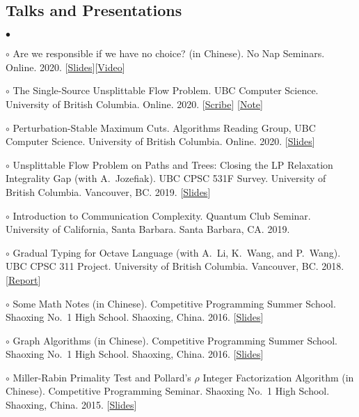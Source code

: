\documentclass[margin,line]{res}
\newenvironment{list2}{
  \begin{list}{$\bullet$}{%
      \setlength{\itemsep}{0in}
      \setlength{\parsep}{0in} \setlength{\parskip}{0in}
      \setlength{\topsep}{0in} \setlength{\partopsep}{0in}
      \setlength{\leftmargin}{0.2in}}}{\end{list}}
\begin{document}
\begin{resume}
\section{\sc Talks and Presentations}

\begin{list2}
\item[$\circ$] Are we responsible if we have no choice? (in Chinese). No Nap Seminars. Online. 2020. [\href{http://ypan.me/docs/pap.pdf}{Slides}][\href{https://www.youtube.com/watch?v=xYKlstE4aBs}{Video}]
\item[$\circ$] The Single-Source Unsplittable Flow Problem. UBC Computer Science. University of British Columbia. Online. 2020. [\href{http://ypan.me/docs/ssufp-scribe.pdf}{Scribe}] [\href{http://ypan.me/docs/ssufp-note.pdf}{Note}]
\item[$\circ$] Perturbation-Stable Maximum Cuts. Algorithms Reading Group, UBC Computer Science. University of British Columbia. Online. 2020. [\href{http://ypan.me/docs/maxcut.pdf}{Slides}]
\item[$\circ$] Unsplittable Flow Problem on Paths and Trees: Closing the LP Relaxation Integrality Gap (with A.\ Jozefiak). UBC CPSC 531F Survey. University of British Columbia. Vancouver, BC. 2019. [\href{http://ypan.me/docs/ufp-slides.pdf}{Slides}]
\item[$\circ$] Introduction to Communication Complexity. Quantum Club Seminar. University of California, Santa Barbara. Santa Barbara, CA. 2019.
\item[$\circ$] Gradual Typing for Octave Language (with A.\ Li, K.\ Wang, and P.\ Wang). UBC CPSC 311 Project. University of British Columbia. Vancouver, BC. 2018. [\href{http://ypan.me/docs/gradual-octave.pdf}{Report}]
\item[$\circ$] Some Math Notes (in Chinese). Competitive Programming Summer School. Shaoxing No.\ 1 High School. Shaoxing, China. 2016. [\href{http://ypan.me/docs/math.pdf}{Slides}]
\item[$\circ$] Graph Algorithms (in Chinese). Competitive Programming Summer School. Shaoxing No.\ 1 High School. Shaoxing, China. 2016. [\href{http://ypan.me/docs/graph.pdf}{Slides}]
\item[$\circ$] Miller-Rabin Primality Test and Pollard's $\rho$ Integer Factorization Algorithm (in Chinese). Competitive Programming Seminar. Shaoxing No.\ 1 High School. Shaoxing, China. 2015. [\href{http://ypan.me/docs/miller-rabin-pollard-rho.pdf}{Slides}]
\end{list2}



\end{resume}
\end{document}
